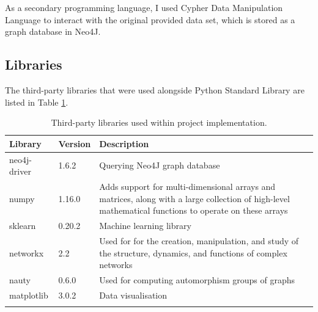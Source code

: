 As a secondary programming language, I used Cypher Data Manipulation Language to interact with the original provided data set, which is stored as a graph database in Neo4J.

\subsection{Libraries}

The third-party libraries that were used alongside Python Standard Library are listed in Table \ref{Libraries}. \bigskip

\begin{longtable}{|p{}|p{}|p{}|}
  \hline
  \textbf{Library} & \textbf{Version} & \textbf{Description}                                                                                                                                  \\
  \hline
  neo4j-driver     & 1.6.2            & Querying Neo4J graph database                                                                                                                         \\

  numpy            & 1.16.0           & Adds support for multi-dimensional arrays and matrices, along with a large collection of high-level mathematical functions to operate on these arrays \\

  sklearn          & 0.20.2           & Machine learning library                                                                                                                              \\

  networkx         & 2.2              & Used for for the creation, manipulation, and study of the structure, dynamics, and functions of complex networks                                      \\
  nauty            & 0.6.0            & Used for computing automorphism groups of graphs                                                                                                      \\

  matplotlib       & 3.0.2            & Data visualisation                                                                                                                                    \\


  \hline
  \caption[Libraries]{Third-party libraries used within project implementation.}
  \label{Libraries}
\end{longtable} \bigskip

